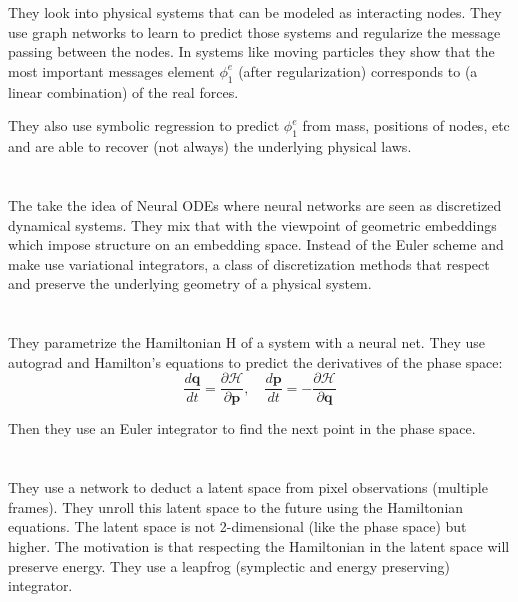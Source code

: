 \documentclass{article}
\newcommand{\citeall}[1]{\citeauthor{#1}}
\begin{document}
\section{\citeall{Cranmer2020DiscoveringBiases}}

They look into physical systems that can be modeled as interacting nodes. They use graph networks to learn to predict those systems and regularize the message passing between the nodes. In systems like moving particles they show that the most important messages element $\phi_1^e$ (after regularization) corresponds to (a linear combination) of the real forces. 

They also use symbolic regression to predict $\phi_1^e$ from mass, positions of nodes, etc and are able to recover (not always) the underlying physical laws.


\section{\citeall{Saemundsson2019VariationalEmbeddings}}

The take the idea of Neural ODEs where neural networks are seen as discretized dynamical systems. They mix that with the viewpoint of geometric embeddings which impose structure on an embedding space. Instead of the Euler scheme and make use variational integrators, a class of discretization methods that respect and preserve the underlying geometry of a physical system.

\section{\citeall{Greydanus2019HamiltonianNetworks}}

They parametrize the Hamiltonian H of a system with a neural net. They use autograd and Hamilton's equations to predict the derivatives of the phase space:
$$
\frac{d \mathbf{q}}{d t}=\frac{\partial \mathcal{H}}{\partial \mathbf{p}}, \quad \frac{d \mathbf{p}}{d t}=-\frac{\partial \mathcal{H}}{\partial \mathbf{q}}
$$

Then they use an Euler integrator to find the next point in the phase space.

\section{\citeall{Toth2019}}

They use a network to deduct a latent space from pixel observations (multiple frames). They unroll this latent space to the future using the Hamiltonian equations. The latent space is not 2-dimensional (like the phase space) but higher. The motivation is that respecting the Hamiltonian in the latent space will preserve energy. They use a leapfrog (symplectic and energy preserving) integrator.
\end{document}
